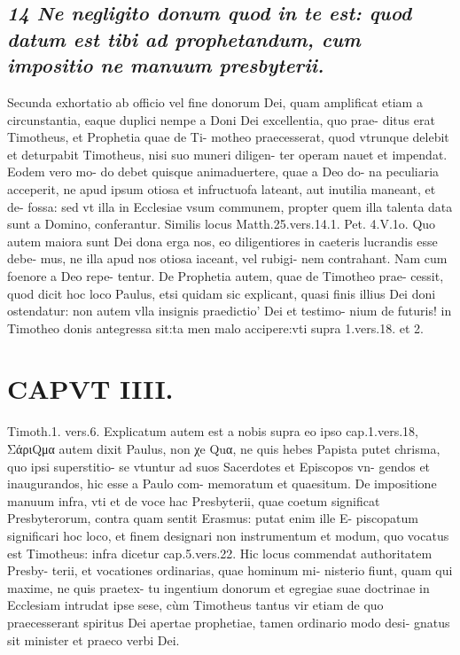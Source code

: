 \documentclass{article}
\begin{document}
\begin{pages}
\subsection*{\textit{14 Ne negligito donum quod in te est: quod datum est tibi ad prophetandum, cum impositio ne manuum presbyterii. }}\pstart Secunda exhortatio ab officio vel fine donorum Dei, quam amplificat etiam a circunstantia, eaque  duplici nempe a Doni Dei excellentia, quo prae- ditus erat Timotheus, et Prophetia quae de Ti- motheo praecesserat, quod vtrunque delebit et deturpabit Timotheus, nisi suo muneri diligen- ter operam nauet et impendat. Eodem vero mo- do debet quisque animaduertere, quae a Deo do- na peculiaria acceperit, ne apud ipsum otiosa et infructuofa lateant, aut inutilia maneant, et de- fossa: sed vt illa in Ecclesiae vsum communem, propter quem illa talenta data sunt a Domino, conferantur.  \pend\pstart Similis locus Matth.25.vers.14.1. Pet. 4.V.1o.  \pend\pstart Quo autem maiora sunt Dei dona erga nos, eo diligentiores in caeteris lucrandis esse debe- mus, ne illa apud nos otiosa iaceant, vel rubigi- nem contrahant. Nam cum foenore a Deo repe- tentur.  \pend\pstart De Prophetia autem, quae de Timotheo prae- cessit, quod dicit hoc loco Paulus, etsi quidam sic explicant, quasi finis illius Dei doni ostendatur: non autem vlla insignis praedictio' Dei et testimo- nium de futuris! in Timotheo donis antegressa sit:ta men malo accipere:vti supra 1.vers.18. et 2.  \pend
\section*{CAPVT  IIII. }
\marginpar{[ p.235 ]}\pstart Timoth.1. vers.6. Explicatum autem est a nobis supra eo ipso cap.1.vers.18,  \pend\pstart ΣάριQμα autem dixit Paulus, non χe Quα, ne quis hebes Papista putet chrisma, quo ipsi superstitio- se vtuntur ad suos Sacerdotes et Episcopos vn- gendos et inaugurandos, hic esse a Paulo com- memoratum et quaesitum.  \pend\pstart De impositione manuum infra, vti et de voce hac Presbyterii, quae coetum significat Presbyterorum, contra quam sentit Erasmus: putat enim ille E- piscopatum significari hoc loco, et finem designari non instrumentum et modum, quo vocatus est Timotheus: infra dicetur cap.5.vers.22.  \pend\pstart Hic locus commendat authoritatem Presby- terii, et vocationes ordinarias, quae hominum mi- nisterio fiunt, quam qui maxime, ne quis praetex- tu ingentium donorum et egregiae suae doctrinae in Ecclesiam intrudat ipse sese, cùm Timotheus tantus vir etiam de quo praecesserant spiritus Dei apertae prophetiae, tamen ordinario modo desi- gnatus sit minister et praeco verbi Dei.  \pend
{}
{}

\end{pages}
\end{document}
